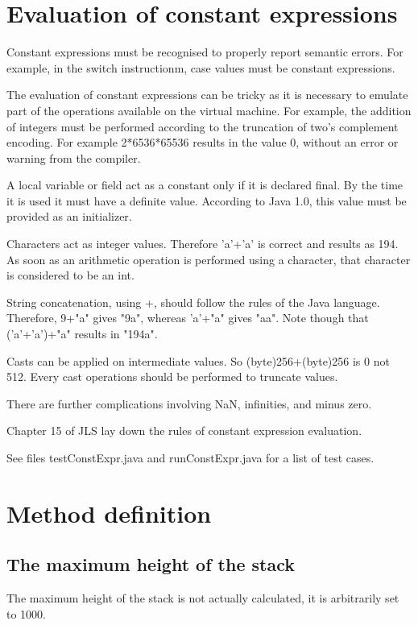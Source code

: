 \documentclass{book}
\begin{document}
\section{Evaluation of constant expressions}

Constant expressions must be recognised to properly report semantic
errors.  For example, in the switch instructionm, case values must be
constant expressions.

The evaluation of constant expressions can be tricky as it is
necessary to emulate part of the operations available on the virtual
machine. For example, the addition of integers must be performed
according to the truncation of two's complement encoding. For 
example 2*6536*65536 results in the value 0, without an error or
warning from the compiler.

A local variable or field act as a constant only if it is declared
final. By the time it is used it must have a definite value. According
to Java 1.0, this value must be provided as an initializer.

Characters act as integer values. Therefore 'a'+'a' is correct and
results as 194. As soon as an arithmetic operation is performed using
a character, that character is considered to be an int.

String concatenation, using +, should follow the rules of the Java
language. Therefore, 9+"a" gives "9a", whereas 'a'+"a" gives "aa".
Note though that ('a'+'a')+"a" results in "194a".

Casts can be applied on intermediate values. So (byte)256+(byte)256 is
0 not 512. Every cast operations should be performed to truncate
values.

There are further complications involving NaN, infinities, and minus
zero. 

Chapter 15 of JLS lay down the rules of constant expression evaluation.

See files testConstExpr.java and runConstExpr.java for a list of
test cases.

\section{Method definition}

\subsection{The maximum height of the stack}

The maximum height of the stack is not actually calculated, it is
arbitrarily set to 1000.
\end{document}
